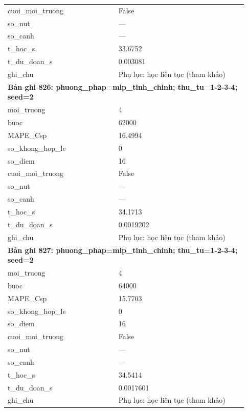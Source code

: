 \begin{longtable}{p{0.43\linewidth}p{0.50\linewidth}}
cuoi\_\allowbreak moi\_\allowbreak truong & False \\
so\_\allowbreak nut & — \\
so\_\allowbreak canh & — \\
t\_\allowbreak hoc\_\allowbreak s & 33.6752 \\
t\_\allowbreak du\_\allowbreak doan\_\allowbreak s & 0.003081 \\
ghi\_\allowbreak chu & Phụ lục: học liên tục (tham khảo) \\
\midrule
\multicolumn{2}{p{0.95\linewidth}}{\textbf{Bản ghi 826: phuong\_phap=mlp\_tinh\_chinh; thu\_tu=1-2-3-4; seed=2}} \\
moi\_\allowbreak truong & 4 \\
buoc & 62000 \\
MAPE\_\allowbreak Csp & 16.4994 \\
so\_\allowbreak khong\_\allowbreak hop\_\allowbreak le & 0 \\
so\_\allowbreak diem & 16 \\
cuoi\_\allowbreak moi\_\allowbreak truong & False \\
so\_\allowbreak nut & — \\
so\_\allowbreak canh & — \\
t\_\allowbreak hoc\_\allowbreak s & 34.1713 \\
t\_\allowbreak du\_\allowbreak doan\_\allowbreak s & 0.0019202 \\
ghi\_\allowbreak chu & Phụ lục: học liên tục (tham khảo) \\
\midrule
\multicolumn{2}{p{0.95\linewidth}}{\textbf{Bản ghi 827: phuong\_phap=mlp\_tinh\_chinh; thu\_tu=1-2-3-4; seed=2}} \\
moi\_\allowbreak truong & 4 \\
buoc & 64000 \\
MAPE\_\allowbreak Csp & 15.7703 \\
so\_\allowbreak khong\_\allowbreak hop\_\allowbreak le & 0 \\
so\_\allowbreak diem & 16 \\
cuoi\_\allowbreak moi\_\allowbreak truong & False \\
so\_\allowbreak nut & — \\
so\_\allowbreak canh & — \\
t\_\allowbreak hoc\_\allowbreak s & 34.5414 \\
t\_\allowbreak du\_\allowbreak doan\_\allowbreak s & 0.0017601 \\
ghi\_\allowbreak chu & Phụ lục: học liên tục (tham khảo) \\

\end{longtable}
